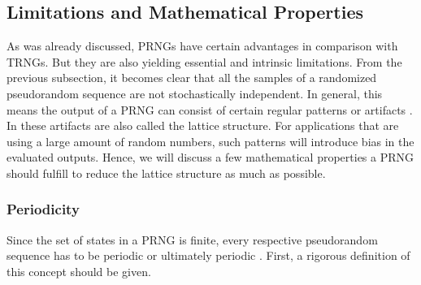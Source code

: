 \documentclass{stdlocal}
\begin{document}

  \subsection{Limitations and Mathematical Properties}
  As was already discussed, PRNGs have certain advantages in comparison with TRNGs.
  But they are also yielding essential and intrinsic limitations.
  From the previous subsection, it becomes clear that all the samples of a randomized pseudorandom sequence are not stochastically independent.
  In general, this means the output of a PRNG can consist of certain regular patterns or artifacts \autocite{lecuyer1994,oneill2014}.
  In \textcite{lecuyer1994} these artifacts are also called the lattice structure.
  For applications that are using a large amount of random numbers, such patterns will introduce bias in the evaluated outputs.
  Hence, we will discuss a few mathematical properties a PRNG should fulfill to reduce the lattice structure as much as possible.

  \subsubsection*{Periodicity}
  Since the set of states in a PRNG is finite, every respective pseudorandom sequence has to be periodic or ultimately periodic \autocite{lecuyer1994,bauke2007}.
  First, a rigorous definition of this concept should be given.
\end{document}
